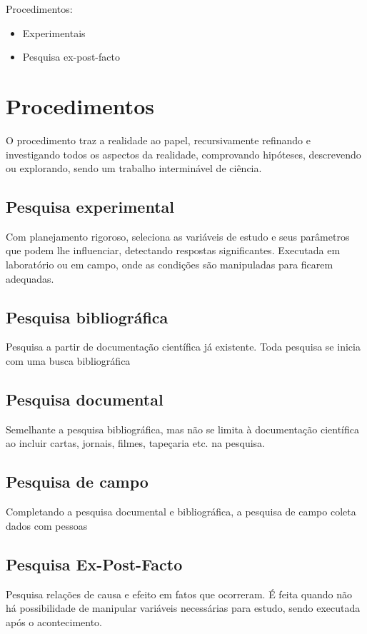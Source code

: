 Procedimentos:
\begin{itemize}
    \item Experimentais
    \item Pesquisa ex-post-facto
\end{itemize}


\section{Procedimentos}
O procedimento traz a realidade ao papel, recursivamente refinando e investigando todos os aspectos da realidade, comprovando hipóteses, descrevendo ou explorando, sendo um trabalho interminável de ciência.

\subsection{Pesquisa experimental}
Com planejamento rigoroso, seleciona as variáveis de estudo e seus parâmetros que podem lhe influenciar, detectando respostas significantes. Executada em laboratório ou em campo, onde as condições são manipuladas para ficarem adequadas.

\subsection{Pesquisa bibliográfica}
Pesquisa a partir de documentação científica já existente. Toda pesquisa se inicia com uma busca bibliográfica

\subsection{Pesquisa documental}
Semelhante a pesquisa bibliográfica, mas não se limita à documentação científica ao incluir cartas, jornais, filmes, tapeçaria etc. na pesquisa.

\subsection{Pesquisa de campo}
Completando a pesquisa documental e bibliográfica, a pesquisa de campo coleta dados com pessoas

\subsection{Pesquisa Ex-Post-Facto}
Pesquisa relações de causa e efeito em fatos que ocorreram. É feita quando não há possibilidade de manipular variáveis necessárias para estudo, sendo executada após o acontecimento.


